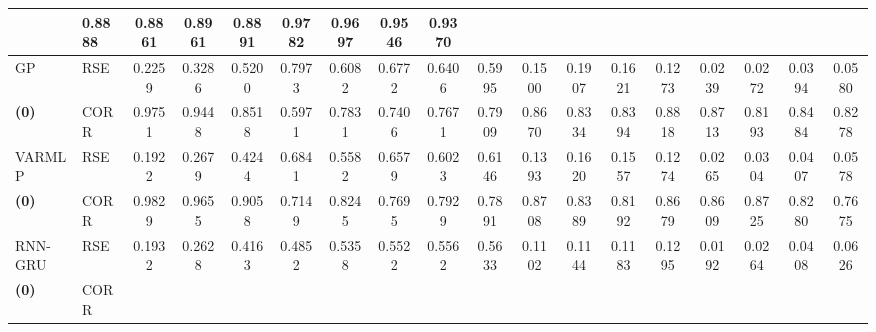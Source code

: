 \begin{table*}[!ht]
{\begin{tabular}{ll|cccc|cccc|cccc|cccc}
  & 0.8888 & 0.8861 & 0.8961 & 0.8891 
  & 0.9782 & 0.9697 & 0.9546 & 0.9370 \\   
\midrule
\multirow{1}{*}{GP}
  & RSE 
	& 0.2259 & 0.3286 & 0.5200 & 0.7973
  & 0.6082 & 0.6772 & 0.6406 & 0.5995
  & 0.1500 & 0.1907 & 0.1621 & 0.1273 
  & 0.0239 & 0.0272 & 0.0394 & 0.0580 \\
  \textbf{(0)} & CORR 
  & 0.9751 & 0.9448 & 0.8518 & 0.5971
  & 0.7831 & 0.7406 & 0.7671 & 0.7909
  & 0.8670 & 0.8334 & 0.8394 & 0.8818
  & 0.8713 & 0.8193 & 0.8484 & 0.8278\\
\midrule
\multirow{1}{*}{VARMLP}
  & RSE 
	& 0.1922 & 0.2679 & 0.4244 & 0.6841 
  & 0.5582 & 0.6579 & 0.6023 & 0.6146 
  & 0.1393 & 0.1620 & 0.1557 & 0.1274
  & 0.0265 & 0.0304 & 0.0407 & 0.0578\\
  \textbf{(0)} & CORR 
  & 0.9829 & 0.9655 & 0.9058 & 0.7149 
  & 0.8245 & 0.7695 & 0.7929 & 0.7891
  & 0.8708 & 0.8389 & 0.8192 & 0.8679
  & 0.8609 & 0.8725 & 0.8280 & 0.7675 \\
\midrule
\multirow{1}{*}{RNN-GRU}
  & RSE 
  & 0.1932 & 0.2628 & 0.4163 & 0.4852 
  & 0.5358 & 0.5522 & 0.5562 & 0.5633 
  & 0.1102 & 0.1144 & 0.1183 & 0.1295 
  & 0.0192 & 0.0264 & 0.0408 & 0.0626\\
  \textbf{(0)} & CORR 

\end{tabular}}
\end{table*}
